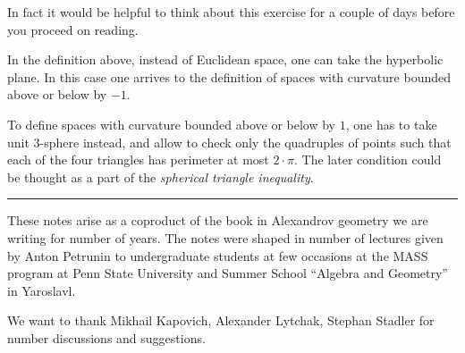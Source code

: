 In fact it would be helpful to think about this exercise for a couple of days before you proceed on reading.

In the definition above, 
instead of Euclidean space, 
one can take the hyperbolic plane.
In this case
one arrives to the definition of spaces with curvature bounded above or below by $-1$.

To define spaces with curvature bounded above or below by $1$,
one has to take unit 3-sphere instead,
and allow to check only the quadruples of points such that each of the four triangles has perimeter at most $2\cdot\pi$.
The later condition could be thought as a part of the {}\emph{spherical triangle inequality}.

\medskip
\noindent\rule{2cm}{0.4pt}

These notes arise as a coproduct of the book in Alexandrov geometry
we are writing for number of years.
The notes were shaped in number of lectures given by Anton Petrunin 
to undergraduate students 
at few occasions at the
MASS program at Penn State University
and Summer School ``Algebra and Geometry'' in Yaroslavl.

We want to thank 
Mikhail Kapovich, 
Alexander Lytchak,
Stephan Stadler
for number discussions and suggestions.








